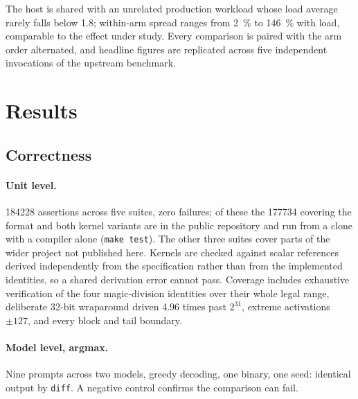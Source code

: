 \documentclass[11pt,a4paper]{article}
\newcommand{\code}[1]{\texttt{#1}}
\begin{document}
The host is shared with an unrelated production workload whose load average
rarely falls below \num{1.8}; within-arm spread ranges from \SI{2}{\percent} to
\SI{146}{\percent} with load, comparable to the effect under study. Every
comparison is paired with the arm order alternated, and headline figures are
replicated across five independent invocations of the upstream benchmark.

\section{Results}\label{sec:results}

\subsection{Correctness}\label{sec:correct}

\paragraph{Unit level.} \num{184228} assertions across five suites, zero
failures; of these the \num{177734} covering the format and both kernel variants
are in the public repository and run from a clone with a compiler alone
(\code{make test}). The other three suites cover parts of the wider project not
published here. Kernels are checked against scalar references derived independently
from the specification rather than from the implemented identities, so a shared
derivation error cannot pass. Coverage includes exhaustive verification of the
four magic-division identities over their whole legal range, deliberate 32-bit
wraparound driven \num{4.96} times past $2^{31}$, extreme activations $\pm 127$,
and every block and tail boundary.

\paragraph{Model level, argmax.} Nine prompts across two models, greedy
decoding, one binary, one seed: identical output by \code{diff}. A negative
control confirms the comparison can fail.
\end{document}
